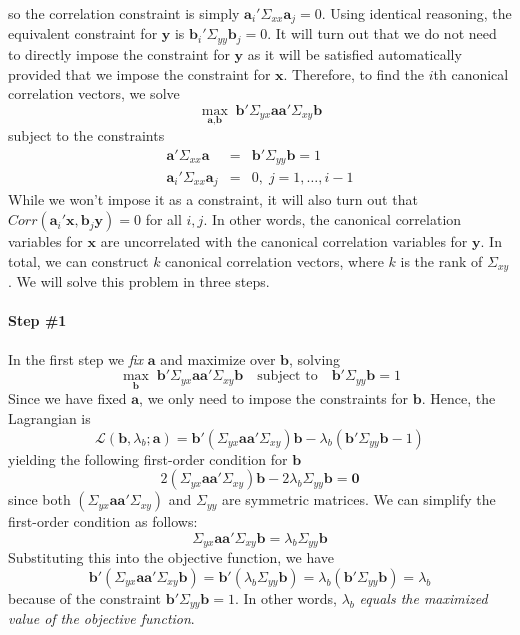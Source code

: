 \documentclass[12pt]{article}
\theoremstyle{definition}
\begin{document}
so the correlation constraint is simply $\mathbf{a}_i' \Sigma_{xx} \mathbf{a}_j = 0$. Using identical reasoning, the equivalent constraint for $\mathbf{y}$ is $\mathbf{b}_i' \Sigma_{yy} \mathbf{b}_j = 0$. It will turn out that we do not need to directly impose the constraint for $\mathbf{y}$ as it will be satisfied automatically provided that we impose the constraint for $\mathbf{x}$. Therefore, to find the $i$th canonical correlation vectors, we solve 
$$\max_{\textbf{a},\textbf{b}}\; \textbf{b}' \Sigma_{yx} \textbf{a}\textbf{a}' \Sigma_{xy}\textbf{b}$$ 
subject to the constraints
\begin{eqnarray*}
   \textbf{a}'\Sigma_{xx}\textbf{a} &=& \textbf{b}' \Sigma_{yy} \textbf{b} = 1\\
    \mathbf{a}_i' \Sigma_{xx} \mathbf{a}_j &=& 0, \; j = 1, \hdots, i-1
\end{eqnarray*}
While we won't impose it as a constraint, it will also turn out that $Corr(\mathbf{a}_i'\mathbf{x}, \mathbf{b}_j \mathbf{y}) = 0$ for all $i,j$. In other words, the canonical correlation variables for $\mathbf{x}$ are uncorrelated with the canonical correlation variables for $\mathbf{y}$. In total, we can construct $k$ canonical correlation vectors, where $k$ is the rank of $\Sigma_{xy}$. We will solve this problem in three steps.


\paragraph{Step \#1} In the first step we \emph{fix} $\mathbf{a}$ and maximize over $\mathbf{b}$, solving
$$\max_{\textbf{b}} \; \textbf{b}' \Sigma_{yx} \textbf{a}\textbf{a}' \Sigma_{xy}\textbf{b} \quad \mbox{subject to} \quad  \textbf{b}' \Sigma_{yy} \textbf{b} = 1$$
Since we have fixed $\mathbf{a}$, we only need to impose the constraints for $\mathbf{b}$. Hence, the Lagrangian is
  $$\mathcal{L}(\textbf{b}, \lambda_b; \textbf{a}) = \textbf{b}'\left(\Sigma_{yx} \textbf{a}\textbf{a}' \Sigma_{xy} \right)\textbf{b} - \lambda_b\left( \textbf{b}'\Sigma_{yy}\textbf{b} - 1\right)$$
yielding the following first-order condition for $\mathbf{b}$
  $$2\left(\Sigma_{yx} \textbf{a}\textbf{a}' \Sigma_{xy} \right)\textbf{b} - 2\lambda_b \Sigma_{yy} \textbf{b} = \textbf{0}$$
since both $\left(\Sigma_{yx} \textbf{a}\textbf{a}' \Sigma_{xy} \right)$ and $\Sigma_{yy}$ are symmetric matrices. We can simplify the first-order condition as follows:
$$\Sigma_{yx} \textbf{a}\textbf{a}' \Sigma_{xy}\textbf{b} =\lambda_b \Sigma_{yy} \textbf{b} $$
Substituting this into the objective function, we have
  $$ \textbf{b}' \left(\Sigma_{yx} \textbf{a}\textbf{a}' \Sigma_{xy}\textbf{b}\right) =\textbf{b}' (\lambda_b\Sigma_{yy}\textbf{b}) = \lambda_b (\textbf{b}' \Sigma_{yy} \textbf{b}) = \lambda_b$$
because of the constraint $\textbf{b}' \Sigma_{yy} \textbf{b} = 1$. In other words, $\lambda_b$ \emph{equals the maximized value of the objective function}. 
\end{document}
